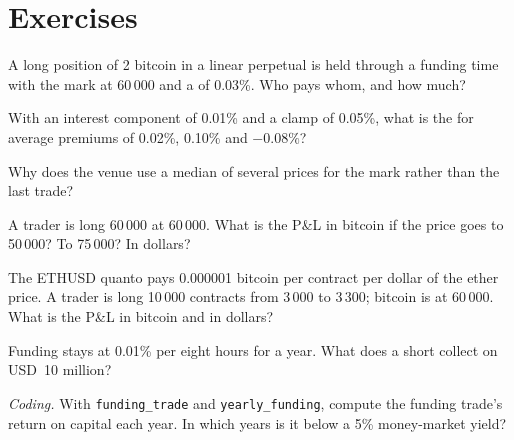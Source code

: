\section{Exercises}

\begin{exercise}[$\star$]\label{exo:m3:perpetual-futures:1}
A long position of 2 bitcoin in a linear perpetual is held through a funding time with the mark at 60\,000 and a
 of 0.03\%. Who pays whom, and how much?
\end{exercise}

\begin{exercise}[$\star$]\label{exo:m3:perpetual-futures:2}
With an interest component of 0.01\% and a clamp of 0.05\%, what is the  for average premiums of 0.02\%,
0.10\% and $-0.08\%$?
\end{exercise}

\begin{exercise}[$\star$]\label{exo:m3:perpetual-futures:3}
Why does the venue use a median of several prices for the mark rather than the last trade?
\end{exercise}

\begin{exercise}[$\star\star$]\label{exo:m3:perpetual-futures:4}
A trader is long 60\,000  at 60\,000. What is the P\&L in bitcoin if the price goes to 50\,000? To
75\,000? In dollars?
\end{exercise}

\begin{exercise}[$\star\star$]\label{exo:m3:perpetual-futures:5}
The ETHUSD quanto pays 0.000001 bitcoin per contract per dollar of the ether price. A trader is long 10\,000 contracts
from 3\,000 to 3\,300; bitcoin is at 60\,000. What is the P\&L in bitcoin and in dollars?
\end{exercise}

\begin{exercise}[$\star\star$]\label{exo:m3:perpetual-futures:6}
Funding stays at 0.01\% per eight hours for a year. What does a short collect on USD~10 million?
\end{exercise}

\begin{exercise}[$\star\star\star$]\label{exo:m3:perpetual-futures:7}
\emph{Coding.} With \texttt{funding\_trade} and \texttt{yearly\_funding}, compute the funding trade's return on
capital each year. In which years is it below a 5\% money-market yield?
\end{exercise}


